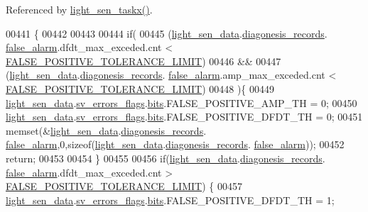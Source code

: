 Referenced by \hyperlink{a00047_source_l00065}{light\+\_\+sen\+\_\+taskx()}.


\begin{DoxyCode}
00441                                                    \{
00442 
00443 
00444     \textcolor{keywordflow}{if}(
00445      (\hyperlink{a00047_a53c98c9f84d5cecf0747bbe1f6b83696}{light\_sen\_data}.\hyperlink{a00024_a7ae905b560513ad201e58c2f63375030}{diagonesis\_records}.
      \hyperlink{a00017_a799f50625c0c03f9404a59287810113d}{false\_alarm}.dfdt\_max\_exceded.cnt < \hyperlink{a00024_aa88a423475bb5b13601785eed80fb1b9}{FALSE\_POSITIVE\_TOLERANCE\_LIMIT})
00446           &&
00447      (\hyperlink{a00047_a53c98c9f84d5cecf0747bbe1f6b83696}{light\_sen\_data}.\hyperlink{a00024_a7ae905b560513ad201e58c2f63375030}{diagonesis\_records}.
      \hyperlink{a00017_a799f50625c0c03f9404a59287810113d}{false\_alarm}.amp\_max\_exceded.cnt < \hyperlink{a00024_aa88a423475bb5b13601785eed80fb1b9}{FALSE\_POSITIVE\_TOLERANCE\_LIMIT})
00448      )\{
00449       \hyperlink{a00047_a53c98c9f84d5cecf0747bbe1f6b83696}{light\_sen\_data}.\hyperlink{a00024_aaeec6b0609dba31393f337abf1cce3d3}{sv\_errors\_flags}.\hyperlink{a00022_ab81eb6fb4f1351ed07b4d6c4dd6f1959}{bits}.FALSE\_POSITIVE\_AMP\_TH  = 0;
00450       \hyperlink{a00047_a53c98c9f84d5cecf0747bbe1f6b83696}{light\_sen\_data}.\hyperlink{a00024_aaeec6b0609dba31393f337abf1cce3d3}{sv\_errors\_flags}.\hyperlink{a00022_ab81eb6fb4f1351ed07b4d6c4dd6f1959}{bits}.FALSE\_POSITIVE\_DFDT\_TH = 0;
00451       memset(&\hyperlink{a00047_a53c98c9f84d5cecf0747bbe1f6b83696}{light\_sen\_data}.\hyperlink{a00024_a7ae905b560513ad201e58c2f63375030}{diagonesis\_records}.
      \hyperlink{a00017_a799f50625c0c03f9404a59287810113d}{false\_alarm},0,\textcolor{keyword}{sizeof}(\hyperlink{a00047_a53c98c9f84d5cecf0747bbe1f6b83696}{light\_sen\_data}.\hyperlink{a00024_a7ae905b560513ad201e58c2f63375030}{diagonesis\_records}.
      \hyperlink{a00017_a799f50625c0c03f9404a59287810113d}{false\_alarm}));
00452       \textcolor{keywordflow}{return};
00453 
00454     \}
00455 
00456       \textcolor{keywordflow}{if}(\hyperlink{a00047_a53c98c9f84d5cecf0747bbe1f6b83696}{light\_sen\_data}.\hyperlink{a00024_a7ae905b560513ad201e58c2f63375030}{diagonesis\_records}.
      \hyperlink{a00017_a799f50625c0c03f9404a59287810113d}{false\_alarm}.dfdt\_max\_exceded.cnt > \hyperlink{a00024_aa88a423475bb5b13601785eed80fb1b9}{FALSE\_POSITIVE\_TOLERANCE\_LIMIT})
      \{
00457           \hyperlink{a00047_a53c98c9f84d5cecf0747bbe1f6b83696}{light\_sen\_data}.\hyperlink{a00024_aaeec6b0609dba31393f337abf1cce3d3}{sv\_errors\_flags}.\hyperlink{a00022_ab81eb6fb4f1351ed07b4d6c4dd6f1959}{bits}.FALSE\_POSITIVE\_DFDT\_TH = 1;

\end{DoxyCode}
